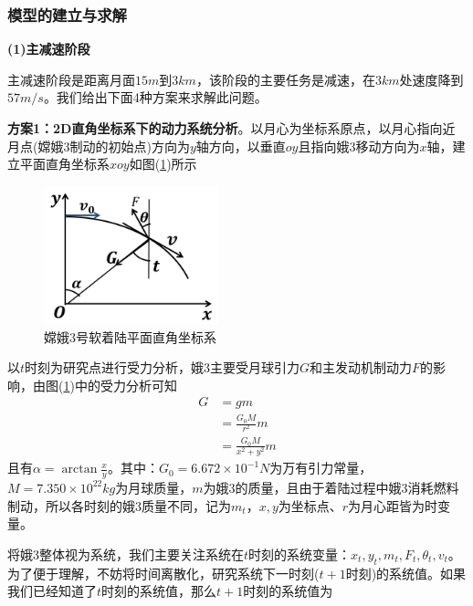         \subsubsection{模型的建立与求解}
            \par
            \textbf{(1)主减速阶段}
            \par
            主减速阶段是距离月面$15m$到$3km$，该阶段的主要任务是减速，在$3km$处速度降到$57m/s$。我们给出下面4种方案来求解此问题。
            \par
            \textbf{方案1：2D直角坐标系下的动力系统分析}。以月心为坐标系原点，以月心指向近月点(嫦娥3制动的初始点)方向为$y$轴方向，以垂直$oy$且指向娥3移动方向为$x$轴，建立平面直角坐标系$xoy$如图(\ref{fig:嫦娥3号软着陆平面直角坐标系})所示
            \begin{figure}[H]
            \centering
            \includegraphics[height=4cm]{images/Soft_landing.jpg}
            \caption{嫦娥3号软着陆平面直角坐标系}
            \label{fig:嫦娥3号软着陆平面直角坐标系}
            \end{figure}
            \par
            以$t$时刻为研究点进行受力分析，娥3主要受月球引力$G$和主发动机制动力$F$的影响，由图(\ref{fig:嫦娥3号软着陆平面直角坐标系})中的受力分析可知
            \begin{align*}
            G &= gm\\
            &=\frac{G_0M}{r^2}m\\
            &=\frac{G_0M}{x^2+y^2}m
            \end{align*}
            且有$\alpha = \arctan\frac{x}{y}$。其中：$G_0=6.672\times10^{-1}N$为万有引力常量，$M=7.350\times 10^{22}kg$为月球质量，$m$为娥3的质量，且由于着陆过程中娥3消耗燃料制动，所以各时刻的娥3质量不同，记为$m_t$，$x,y$为坐标点、$r$为月心距皆为时变量。
            \par
            将娥3整体视为系统，我们主要关注系统在$t$时刻的系统变量：$x_t,y_t,m_t,F_t,\theta_t,v_t$。为了便于理解，不妨将时间离散化，研究系统下一时刻($t+1$时刻)的系统值。如果我们已经知道了$t$时刻的系统值，那么$t+1$时刻的系统值为
